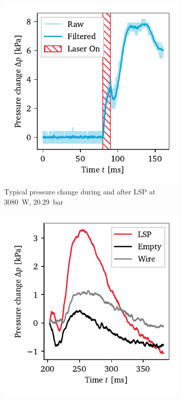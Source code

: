             \begin{figure}[h]
                \centering
                \begin{subfigure}[t]{0.47\textwidth}
                    \centering
                    \includegraphics[width=\textwidth]{assets/5 results/pressure_noise}
                    \caption{Typical pressure change during and after LSP at \qty{3080}{W}, \qty{20.29}{bar}}
                    \label{fig:pressure_noise}
                \end{subfigure}
                \hfill
                \begin{subfigure}[t]{0.47\textwidth}
                    \centering
                    \includegraphics[width=\textwidth]{assets/5 results/pressure_elim}

\end{subfigure}
\end{figure}
